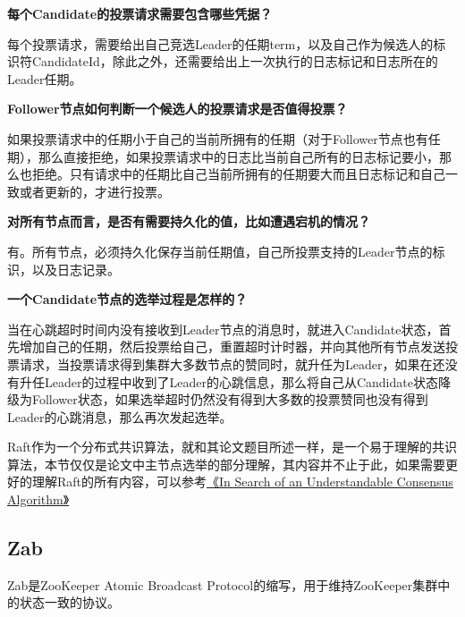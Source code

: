 \documentclass{article}
\begin{document}
\textbf{每个Candidate的投票请求需要包含哪些凭据？}

每个投票请求，需要给出自己竞选Leader的任期term，以及自己作为候选人的标识符CandidateId，除此之外，还需要给出上一次执行的日志标记和日志所在的Leader任期。

\textbf{Follower节点如何判断一个候选人的投票请求是否值得投票？}

如果投票请求中的任期小于自己的当前所拥有的任期（对于Follower节点也有任期），那么直接拒绝，如果投票请求中的日志比当前自己所有的日志标记要小，那么也拒绝。只有请求中的任期比自己当前所拥有的任期要大而且日志标记和自己一致或者更新的，才进行投票。

\textbf{对所有节点而言，是否有需要持久化的值，比如遭遇宕机的情况？}

有。所有节点，必须持久化保存当前任期值，自己所投票支持的Leader节点的标识，以及日志记录。

\textbf{一个Candidate节点的选举过程是怎样的？}

当在心跳超时时间内没有接收到Leader节点的消息时，就进入Candidate状态，首先增加自己的任期，然后投票给自己，重置超时计时器，并向其他所有节点发送投票请求，当投票请求得到集群大多数节点的赞同时，就升任为Leader，如果在还没有升任Leader的过程中收到了Leader的心跳信息，那么将自己从Candidate状态降级为Follower状态，如果选举超时仍然没有得到大多数的投票赞同也没有得到Leader的心跳消息，那么再次发起选举。

Raft作为一个分布式共识算法，就和其论文题目所述一样，是一个易于理解的共识算法，本节仅仅是论文中主节点选举的部分理解，其内容并不止于此，如果需要更好的理解Raft的所有内容，可以参考\href{https://raft.github.io/raft.pdf}{《In Search of an Understandable Consensus Algorithm》}


\subsection{Zab}

Zab是ZooKeeper Atomic Broadcast Protocol的缩写，用于维持ZooKeeper集群中的状态一致的协议。



\end{document}
